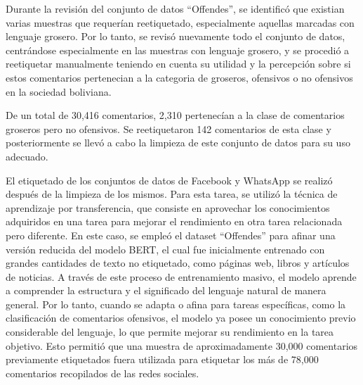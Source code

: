 Durante la revisión del conjunto de datos ``Offendes'', se identificó que existian varias muestras que requerían reetiquetado, especialmente aquellas marcadas con lenguaje grosero. Por lo tanto, se revisó nuevamente todo el conjunto de datos, centrándose especialmente en las muestras con lenguaje grosero, y se procedió a reetiquetar manualmente teniendo en cuenta su utilidad y la percepción sobre si estos comentarios pertenecian a la categoria de groseros, ofensivos o no ofensivos en la sociedad boliviana.

De un total de 30,416 comentarios, 2,310 pertenecían a la clase de comentarios groseros pero no ofensivos. Se reetiquetaron 142 comentarios de esta clase y posteriormente se llevó a cabo la limpieza de este conjunto de datos para su uso adecuado.

El etiquetado de los conjuntos de datos de Facebook y WhatsApp se realizó después de la limpieza de los mismos. Para esta tarea, se utilizó la técnica de aprendizaje por transferencia, que consiste en aprovechar los conocimientos adquiridos en una tarea para mejorar el rendimiento en otra tarea relacionada pero diferente. En este caso, se empleó el dataset ``Offendes'' para afinar una versión reducida del modelo BERT, el cual fue inicialmente entrenado con grandes cantidades de texto no etiquetado, como páginas web, libros y artículos de noticias. A través de este proceso de entrenamiento masivo, el modelo aprende a comprender la estructura y el significado del lenguaje natural de manera general. Por lo tanto, cuando se adapta o afina para tareas específicas, como la clasificación de comentarios ofensivos, el modelo ya posee un conocimiento previo considerable del lenguaje, lo que permite mejorar su rendimiento en la tarea objetivo. Esto permitió que una muestra de aproximadamente 30,000 comentarios previamente etiquetados fuera utilizada para etiquetar los más de 78,000 comentarios recopilados de las redes sociales.

